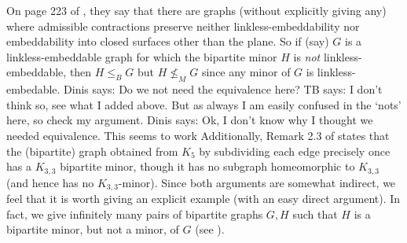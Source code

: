 \documentclass[a4paper,preprint,12pt]{elsarticle}
\newcommand{\therese}[1]{{\color{brown} TB says: #1}}
\newcommand{\dinis}[1]{{\color{blue} Dinis says: #1}}
\newcommand{\therese}[1]{}
\newcommand{\dinis}[1]{}
\newcommand{\bipMinorOf}{\leq_{B}}
\newcommand{\minorOf}{\leq_{M}}
\begin{document}
On page 223 of \cite{bipartiteMinors}, they say that there are graphs (without explicitly giving any) where admissible contractions preserve neither linkless-embeddability nor embeddability into closed surfaces other than the plane.  So if (say) $G$ is a linkless-embeddable graph for which the bipartite minor $H$ is \emph{not} linkless- embeddable, then $H\bipMinorOf G$ but $H\not\minorOf G$ since any minor of $G$ is linkless-embedable.
%
\dinis{Do we not need the equivalence here?}\therese{I don't think so, see what I added above.   But as always I am easily confused in the `nots' here, so check my argument.}\dinis{Ok, I don't know why I thought we needed equivalence. This seems to work}
%
Additionally, Remark 2.3 of \cite{bipartiteMinors} states that the (bipartite) graph obtained from $K_5$ by subdividing each edge precisely once has a $K_{3,3}$ bipartite minor, though it has no subgraph homeomorphic to $K_{3,3}$ (and hence has no $K_{3,3}$-minor).
Since both arguments are somewhat indirect, we feel that it is worth giving an explicit example (with an easy direct argument).
In fact, we give infinitely many pairs of bipartite graphs $G,H$ such that $H$ is a bipartite minor, but not a minor, of $G$  (see ).
\end{document}
